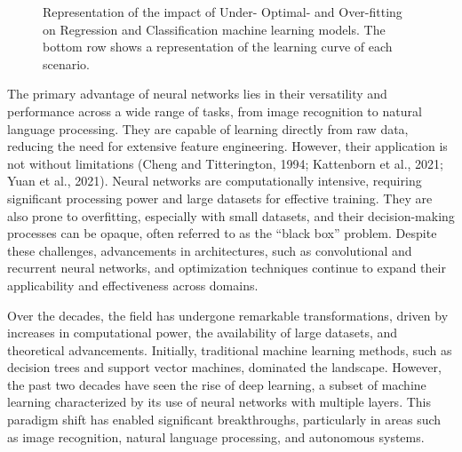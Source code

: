 \documentclass[
  letterpaper,
  11pt,
  english,
  singlespacing,
  headsepline]{MastersDoctoralThesis}
\begin{document}
\begin{spacing}{1.5}
\begin{figure}


\caption{\label{fig-learningRates}Representation of the impact of Under-
Optimal- and Over-fitting on Regression and Classification machine
learning models. The bottom row shows a representation of the learning
curve of each scenario.}

\end{figure}%

The primary advantage of neural networks lies in their versatility and
performance across a wide range of tasks, from image recognition to
natural language processing. They are capable of learning directly from
raw data, reducing the need for extensive feature engineering. However,
their application is not without limitations (Cheng and Titterington,
1994; Kattenborn et al., 2021; Yuan et al., 2021). Neural networks are
computationally intensive, requiring significant processing power and
large datasets for effective training. They are also prone to
overfitting, especially with small datasets, and their decision-making
processes can be opaque, often referred to as the ``black box'' problem.
Despite these challenges, advancements in architectures, such as
convolutional and recurrent neural networks, and optimization techniques
continue to expand their applicability and effectiveness across domains.

Over the decades, the field has undergone remarkable transformations,
driven by increases in computational power, the availability of large
datasets, and theoretical advancements. Initially, traditional machine
learning methods, such as decision trees and support vector machines,
dominated the landscape. However, the past two decades have seen the
rise of deep learning, a subset of machine learning characterized by its
use of neural networks with multiple layers. This paradigm shift has
enabled significant breakthroughs, particularly in areas such as image
recognition, natural language processing, and autonomous systems.


\end{spacing}
\end{document}

